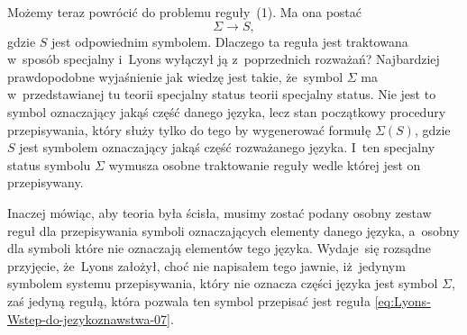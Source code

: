 \documentclass[a4paper,11pt]{article}
\begin{document}
Możemy teraz powrócić do problemu reguły~(1). Ma ona postać
\begin{equation}
  \label{eq:Lyons-Wstep-do-jezykoznawstwa-07}
  \Sigma \to S,
\end{equation}
gdzie $S$ jest odpowiednim symbolem. Dlaczego ta reguła jest traktowana
w~sposób specjalny i~Lyons wyłączył ją z~poprzednich rozważań? Najbardziej
prawdopodobne wyjaśnienie jak wiedzę jest takie, że~symbol $\Sigma$ ma
w~przedstawianej tu teorii specjalny status teorii specjalny status.
Nie jest to symbol oznaczający jakąś część danego języka, lecz stan
początkowy procedury przepisywania, który służy tylko do tego by
wygenerować formułę $\Sigma( S )$, gdzie $S$ jest symbolem oznaczający jakąś
część rozważanego języka. I~ten specjalny status symbolu $\Sigma$ wymusza osobne
traktowanie reguły wedle której jest on przepisywany.

Inaczej mówiąc, aby teoria była ścisła, musimy zostać podany osobny zestaw
reguł dla przepisywania symboli oznaczających elementy danego języka,
a~osobny dla symboli które nie oznaczają elementów tego języka. Wydaje~się
rozsądne przyjęcie, że~Lyons założył, choć nie napisałem tego jawnie,
iż~jedynym symbolem systemu przepisywania, który nie oznacza części języka
jest symbol $\Sigma$, zaś jedyną regułą, która pozwala ten symbol przepisać jest
reguła \eqref{eq:Lyons-Wstep-do-jezykoznawstwa-07}.

\vspace{\spaceFour}





\newpage

\end{document}
